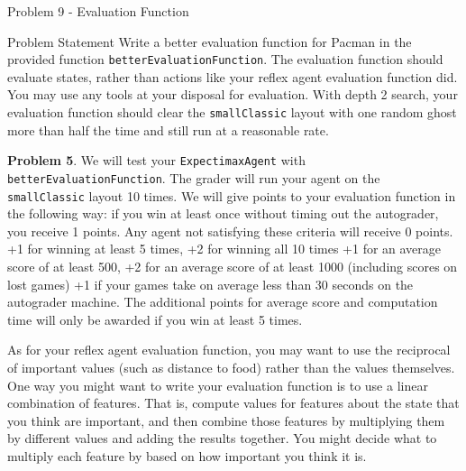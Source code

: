 \begin{problem}{Problem 9 - Evaluation Function}
    \begin{statement}{Problem Statement}
        Write a better evaluation function for Pacman in the provided function \texttt{betterEvaluationFunction}. The evaluation function should evaluate states, rather than actions like your reflex 
        agent evaluation function did. You may use any tools at your disposal for evaluation. With depth 2 search, your evaluation function should clear the \texttt{smallClassic} layout with one random 
        ghost more than half the time and still run at a reasonable rate.

        \begin{center}
            \begin{highlightenv}[15cm]
                \textbf{Problem 5}. We will test your \texttt{ExpectimaxAgent} with \texttt{betterEvaluationFunction}. The grader will run your agent on the \texttt{smallClassic} layout 10 times. We will give 
                points to your evaluation function in the following way: if you win at least once without timing out the autograder, you receive 1 points. Any agent not satisfying these criteria will 
                receive 0 points. +1 for winning at least 5 times, +2 for winning all 10 times +1 for an average score of at least 500, +2 for an average score of at least 1000 (including scores on 
                lost games) +1 if your games take on average less than 30 seconds on the autograder machine. The additional points for average score and computation time will only be awarded if you 
                win at least 5 times.
            \end{highlightenv}
        \end{center}

        As for your reflex agent evaluation function, you may want to use the reciprocal of important values (such as distance to food) rather than the values themselves. One way you might want to 
        write your evaluation function is to use a linear combination of features. That is, compute values for features about the state that you think are important, and then combine those features 
        by multiplying them by different values and adding the results together. You might decide what to multiply each feature by based on how important you think it is.
    \end{statement}


\end{problem}
